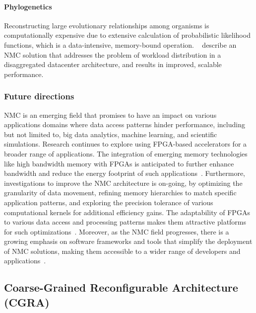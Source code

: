 \paragraph{Phylogenetics} Reconstructing large evolutionary relationships among organisms is computationally expensive due to extensive calculation of probabilistic likelihood functions, which is a data-intensive, memory-bound operation. ~\citet{Alachiotis2021ScalableProcessing} %
describe an NMC solution that addresses the problem of workload distribution in a disaggregated datacenter architecture, and results in improved, scalable performance. %


\subsubsection*{\bf{Future directions}}
NMC is an emerging field that promises to have an impact on various applications domains where data access patterns hinder performance, including but not limited to, big data analytics, machine learning, and scientific simulations. Research continues to explore using FPGA-based accelerators for a broader range of applications. The integration of emerging memory technologies like high bandwidth memory with FPGAs is anticipated to further enhance bandwidth and reduce the energy footprint of such applications~\cite{Singh2019Near-memoryFuture}. Furthermore, investigations to improve the NMC architecture is on-going, by optimizing the granularity of data movement, refining memory hierarchies to match specific application patterns, and exploring the precision tolerance of various computational kernels for additional efficiency gains. The adaptability of FPGAs to various data access and processing patterns makes them attractive platforms for such optimizations~\cite{Singh2019Near-memoryFuture}. Moreover, as the NMC field progresses, there is a growing emphasis on software frameworks and tools that simplify the deployment of NMC solutions, making them accessible to a wider range of developers and applications~\cite{Abrahamse2022Memory-DisaggregatedApplications}.



\subsection{Coarse-Grained Reconfigurable Architecture (CGRA)}

